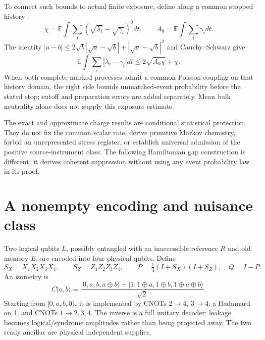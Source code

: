 \documentclass[11pt,oneside,openany]{book}
\theoremstyle{definition}
\theoremstyle{remark}\newtheorem{remark}[theorem]{Remark}
\begin{document}
To connect such bounds to actual finite exposure, define along a common stopped history
\[
 \chi=\mathbb E\int\sum_i(\sqrt{\lambda_i}-\sqrt{\gamma_i})^2dt,
 \qquad A_0=\mathbb E\int\sum_i\gamma_i dt.
\]
The identity $|a-b|\le2\sqrt b|\sqrt a-\sqrt b|+|\sqrt a-\sqrt b|^2$ and Cauchy--Schwarz give
\begin{equation}
 \mathbb E\int\sum_i|\lambda_i-\gamma_i|dt
                  \le2\sqrt{A_0\chi}+\chi.
 \label{prot:exposure}
\end{equation}
When both complete marked processes admit a common Poisson coupling on that history domain, the right side bounds unmatched-event probability before the stated stop; cutoff and preparation errors are added separately. Mean bulk neutrality alone does not supply this exposure estimate.

The exact and approximate charge results are conditional statistical protection. They do not fix the common scalar rate, derive primitive Markov chemistry, forbid an unrepresented stress register, or establish universal admission of the positive source-instrument class. The following Hamiltonian gap construction is different: it derives coherent suppression without using any event probability law in its proof.

\section{A nonempty encoding and nuisance class}

Two logical qubits $L$, possibly entangled with an inaccessible reference $R$ and old memory $E$, are encoded into four physical qubits. Define
\begin{equation}
 S_X=X_1X_2X_3X_4,\qquad S_Z=Z_1Z_2Z_3Z_4,
 \qquad P=\tfrac14(I+S_X)(I+S_Z),\quad Q=I-P.
 \label{prot:code}
\end{equation}
An isometry is
\begin{equation}
 C|a,b\rangle=\frac{|0,a,b,a\oplus b\rangle+
 |1,1\oplus a,1\oplus b,1\oplus a\oplus b\rangle}{\sqrt2}.
 \label{prot:encoder}
\end{equation}
Starting from $|0,a,b,0\rangle$, it is implemented by CNOTs $2\to4$, $3\to4$, a Hadamard on 1, and CNOTs $1\to2,3,4$. The inverse is a full unitary decoder; leakage becomes logical/syndrome amplitudes rather than being projected away. The two ready ancillas are physical independent supplies.
\end{document}
